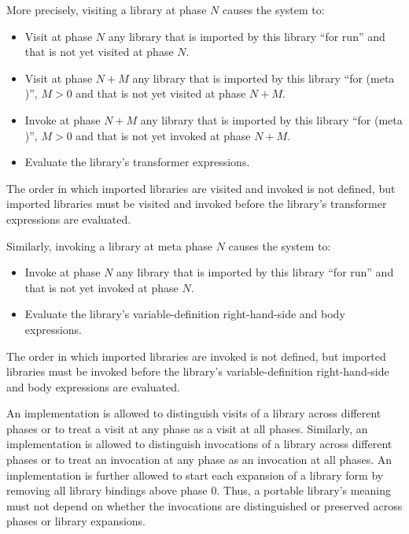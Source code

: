 More precisely, visiting a library at phase $N$ causes the system to:

\begin{itemize}
\item Visit at phase $N$ any library that is imported by this library
      ``for {\cf run}'' and that is not yet visited at phase $N$.
\item Visit at phase $N+M$ any library that is imported by this
      library ``for {\cf (meta )}'', $M>0$ and that is not yet
      visited at phase $N+M$.
\item Invoke at phase $N+M$ any library that is imported by this
      library ``for {\cf (meta )}'', $M>0$ and that is not yet
      invoked at phase $N+M$.
\item Evaluate the library's transformer expressions.
\end{itemize}

The order in which imported libraries are visited and invoked is not
defined, but imported libraries must be visited and invoked before the
library's transformer expressions are evaluated.

Similarly, invoking a library at meta phase $N$ causes the system to:

\begin{itemize}
\item Invoke at phase $N$ any library that is imported by this library
      ``for {\cf run}'' and that is not yet invoked at phase $N$.
\item Evaluate the library's variable-definition right-hand-side and body
      expressions.
\end{itemize}

The order in which imported libraries are invoked is not defined, but
imported libraries must be invoked before the library's variable-definition
right-hand-side and body expressions are evaluated.

An implementation is allowed to distinguish visits of a library across
different phases or to treat a visit at any phase as a visit at all
phases.
Similarly, an implementation is allowed to distinguish invocations of a
library across different phases or to treat an invocation at any phase as
an invocation at all phases.
An implementation is further allowed to start each expansion of a
{\cf library} form by removing all library bindings above phase 0.
Thus, a portable library's meaning must not depend on whether the
invocations are distinguished or preserved across phases or {\cf library}
expansions.

